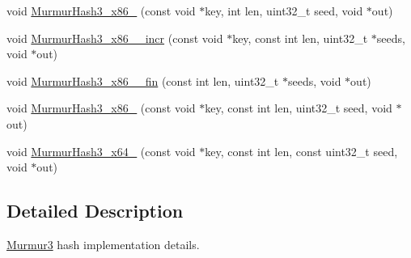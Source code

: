 \begin{DoxyCompactItemize}
\item 
void \hyperlink{group__hash__murmur3_ga05715b47dc242ffd2bb485451ecc6cc9}{Murmur\+Hash3\+\_\+x86\+\_} (const void $\ast$key, int len, uint32\+\_\+t seed, void $\ast$out)
\item 
void \hyperlink{group__hash__murmur3_ga284086a230b4549dd730837edf8c25e6}{Murmur\+Hash3\+\_\+x86\+\_\+\_\+incr} (const void $\ast$key, const int len, uint32\+\_\+t $\ast$seeds, void $\ast$out)
\item 
void \hyperlink{group__hash__murmur3_ga9b5a153dfe6a69d25f8d90fc9b7aee32}{Murmur\+Hash3\+\_\+x86\+\_\+\_\+fin} (const int len, uint32\+\_\+t $\ast$seeds, void $\ast$out)
\item 
void \hyperlink{group__hash__murmur3_ga7bc4daaa97ce24425471bb2231316be9}{Murmur\+Hash3\+\_\+x86\+\_} (const void $\ast$key, const int len, uint32\+\_\+t seed, void $\ast$out)
\item 
void \hyperlink{group__hash__murmur3_ga2c91387f5b5beb8f4978e5447b5baf20}{Murmur\+Hash3\+\_\+x64\+\_} (const void $\ast$key, const int len, const uint32\+\_\+t seed, void $\ast$out)
\end{DoxyCompactItemize}


\subsection{Detailed Description}
\hyperlink{classns3_1_1Hash_1_1Function_1_1Murmur3}{Murmur3} hash implementation details. 